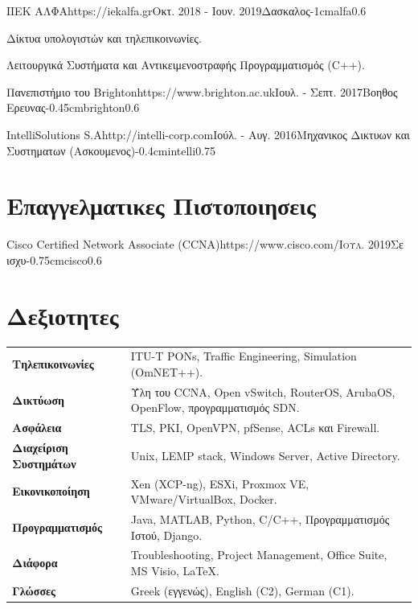 \documentclass{mycv}
\begin{document}
	\vspace*{0.5cm}
	
	\begin{EntryDatedLogo}{ΙΙΕΚ ΑΛΦΑ}{https://iekalfa.gr}{Οκτ. 2018 - Ιουν. 2019}{Δασκαλος}{-1cm}{alfa}{0.6}
		\begin{Itemize}
			\item Δίκτυα υπολογιστών και τηλεπικοινωνίες.
			\item Λειτουργικά Συστήματα και Αντικειμενοστραφής Προγραμματισμός (C++).
		\end{Itemize}
	\end{EntryDatedLogo}

	\vspace*{0.5cm}
		
	\begin{EntryDatedLogo}{Πανεπιστήμιο του Brighton}{https://www.brighton.ac.uk}{Ιουλ. - Σεπτ. 2017}{Βοηθος Ερευνας}{-0.45cm}{brighton}{0.6}
	\end{EntryDatedLogo}

	\vspace*{0.75cm}	

	\begin{EntryDatedLogo}{IntelliSolutions S.A}{http://intelli-corp.com}{Ιούλ. - Αυγ. 2016}{Μηχανικος Δικτυων και Συστηματων (Ασκουμενος)}{-0.4cm}{intelli}{0.75}
	\end{EntryDatedLogo}
	\newpage
	
	\section{Επαγγελματικες Πιστοποιησεις}
	\begin{EntryDatedLogo}{Cisco Certified Network Associate (CCNA)}{https://www.cisco.com/}{\scshape{Ιουλ. 2019}}{Σε ισχυ}{-0.75cm}{cisco}{0.6}
	\end{EntryDatedLogo}
	\vspace{0.25cm}
	
	\section{Δεξιοτητες}
	\begin{tabular}{m{4.5cm} m{13cm}}\renewcommand{\arraystretch}{2}
		\textbf{Τηλεπικοινωνίες}   		& ITU-T PONs, Traffic Engineering, Simulation (OmNET++). \\
		\textbf{Δικτύωση}   			& Ύλη του CCNA, Open vSwitch, RouterOS, ArubaOS, OpenFlow, προγραμματισμός SDN.\\
		\textbf{Ασφάλεια}				& TLS, PKI, OpenVPN, pfSense, ACLs και Firewall. \\
		\textbf{Διαχείριση Συστημάτων}	& Unix, LEMP stack, Windows Server, Active Directory. \\
		\textbf{Εικονικοποίηση}			& Xen (XCP-ng), ESXi, Proxmox VE, VMware/VirtualBox, Docker.\\ 
		\textbf{Προγραμματισμός} 	    & Java, MATLAB, Python, C/C++, Προγραμματισμός Ιστού, Django. \\
		\textbf{Διάφορα}				& Troubleshooting, Project Management, Office Suite, MS Visio, \LaTeX. \\
		\textbf{Γλώσσες} 				& Greek (εγγενώς), English (C2), German (C1). 
	\end{tabular}
\end{document}
